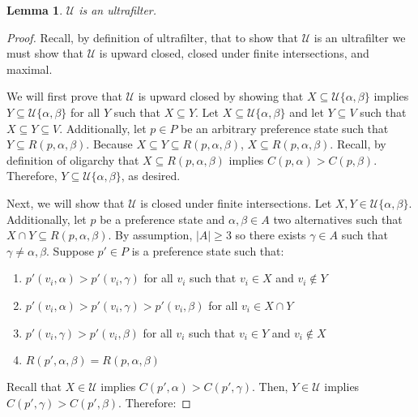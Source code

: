 \documentclass{amsart}
\newtheorem{lemma}{Lemma}
\theoremstyle{plain}
\begin{document}
\begin{lemma}
    $\mathcal{U}$ is an ultrafilter.
\end{lemma}

\begin{proof}
    
Recall, by definition of ultrafilter, that to show that $\mathcal{U}$ is an ultrafilter we must show that $\mathcal{U}$ is upward closed, closed under finite intersections, and maximal.

We will first prove that $\mathcal{U}$ is upward closed by showing that $X \subseteq \mathcal{U}\{\alpha, \beta\}$ implies $Y \subseteq \mathcal{U}\{\alpha, \beta\}$ for all $Y$ such that $X \subseteq Y$. Let $X \subseteq \mathcal{U}\{\alpha, \beta\}$ and let $Y \subseteq V$ such that $X \subseteq Y \subseteq V$. Additionally, let $p \in P$ be an arbitrary preference state such that $Y \subseteq R(p, \alpha, \beta)$. Because $X \subseteq Y \subseteq R(p, \alpha, \beta)$, $X \subseteq R(p, \alpha, \beta)$. Recall, by definition of oligarchy that $X \subseteq R(p, \alpha, \beta)$ implies $C(p, \alpha) > C(p, \beta)$. Therefore, $Y \subseteq \mathcal{U}\{\alpha, \beta\}$, as desired.

Next, we will show that $\mathcal{U}$ is closed under finite intersections. Let $X,Y \in \mathcal{U}\{\alpha, \beta\}$. Additionally, let $p$ be a preference state and $\alpha, \beta \in A$ two alternatives such that $X \cap Y \subseteq R(p, \alpha, \beta)$. By assumption, $|A| \ge 3$ so there exists $\gamma \in A$ such that $\gamma \ne \alpha, \beta$. Suppose $p' \in P$ is a preference state such that: 

\vskip 0.25cm

\begin{enumerate}
    \item $p'(v_i, \alpha) > p'(v_i, \gamma)$ for all $v_i$ such that $v_i \in X$ and $v_i \notin Y$ 
    \item $p'(v_i, \alpha) > p'(v_i, \gamma) > p'(v_i, \beta)$ for all $v_i \in X \cap Y$
    \item $p'(v_i, \gamma) > p'(v_i, \beta)$ for all $v_i$  such that $v_i \in Y$ and $v_i \notin X$ 
    \item $R(p', \alpha, \beta) = R(p, \alpha, \beta)$
\end{enumerate}

\vskip 0.25cm

\noindent Recall that $X \in \mathcal{U}$ implies $C(p', \alpha) > C(p', \gamma)$. Then, $Y \in \mathcal{U}$ implies $C(p', \gamma) > C(p', \beta)$. Therefore:


\end{proof}
\end{document}
